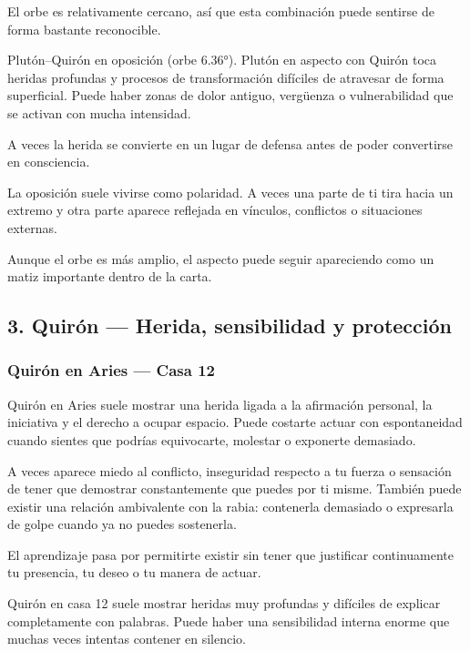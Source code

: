 \documentclass[11pt,a4paper]{article}
\begin{document}
El orbe es relativamente cercano, así que esta combinación puede sentirse de forma bastante reconocible.

Plutón–Quirón en oposición (orbe 6.36°).
Plutón en aspecto con Quirón toca heridas profundas y procesos de transformación difíciles de atravesar de forma superficial. Puede haber zonas de dolor antiguo, vergüenza o vulnerabilidad que se activan con mucha intensidad.

A veces la herida se convierte en un lugar de defensa antes de poder convertirse en consciencia.

La oposición suele vivirse como polaridad. A veces una parte de ti tira hacia un extremo y otra parte aparece reflejada en vínculos, conflictos o situaciones externas.

Aunque el orbe es más amplio, el aspecto puede seguir apareciendo como un matiz importante dentro de la carta.

\vspace{0.4cm}

\subsection{3. Quirón — Herida, sensibilidad y protección}

\subsubsection*{Quirón en Aries — Casa 12}

Quirón en Aries suele mostrar una herida ligada a la afirmación personal, la iniciativa y el derecho a ocupar espacio. Puede costarte actuar con espontaneidad cuando sientes que podrías equivocarte, molestar o exponerte demasiado.

A veces aparece miedo al conflicto, inseguridad respecto a tu fuerza o sensación de tener que demostrar constantemente que puedes por ti misme. También puede existir una relación ambivalente con la rabia: contenerla demasiado o expresarla de golpe cuando ya no puedes sostenerla.

El aprendizaje pasa por permitirte existir sin tener que justificar continuamente tu presencia, tu deseo o tu manera de actuar.

Quirón en casa 12 suele mostrar heridas muy profundas y difíciles de explicar completamente con palabras. Puede haber una sensibilidad interna enorme que muchas veces intentas contener en silencio.
\end{document}
